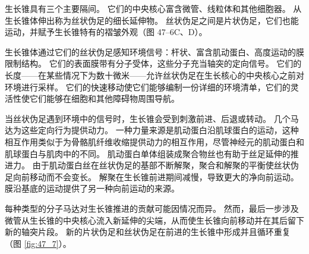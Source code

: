 生长锥具有三个主要隔间。 它们的中央核心富含微管、线粒体和其他细胞器。 从生长锥体伸出称为丝状伪足的细长延伸物。 丝状伪足之间是片状伪足，它们也能运动，并赋予生长锥特有的褶皱外观（图 47–6C、D）。

生长锥体通过它们的丝状伪足感知环境信号：杆状、富含肌动蛋白、高度运动的膜限制结构。 它们的表面膜带有分子受体，这些分子充当轴突的定向信号。 它们的长度——在某些情况下为数十微米——允许丝状伪足在生长核心的中央核心之前对环境进行采样。 它们的快速移动使它们能够编制一份详细的环境清单，它们的灵活性使它们能够在细胞和其他障碍物周围导航。

当丝状伪足遇到环境中的信号时，生长锥会受到刺激前进、后退或转动。 几个马达为这些定向行为提供动力。 一种力量来源是肌动蛋白沿肌球蛋白的运动，这种相互作用类似于为骨骼肌纤维收缩提供动力的相互作用，尽管神经元的肌动蛋白和肌球蛋白与肌肉中的不同。 肌动蛋白单体组装成聚合物丝也有助于丝足延伸的推进力。 由于肌动蛋白丝在丝状伪足的基部不断解聚，聚合和解聚的平衡使丝状伪足向前移动而不会变长。 解聚在生长锥前进期间减慢，导致更大的净向前运动。 膜沿基底的运动提供了另一种向前运动的来源。

每种类型的分子马达对生长锥推进的贡献可能因情况而异。 然而，最后一步涉及微管从生长锥的中央核心流入新延伸的尖端，从而使生长锥向前移动并在其后留下新的轴突片段。 
新的片状伪足和丝状伪足在前进的生长锥中形成并且循环重复（图 \ref{fig:47_7}）。

